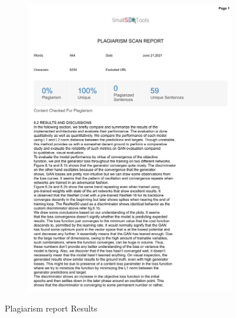 \documentclass[oneside,a4paper,12pt]{report}
\begin{document}
\begin{appendices}
\begin{figure}
	\begin{subfigure}[H]{\textwidth}
		\centering
    	\includegraphics[scale=0.7, page=1]{plagiarism/results_1.pdf}
    \end{subfigure}
 \caption{Plagiarism report Results}
    \label{PlagiarismResults}
\end{figure}
\begin{figure}\ContinuedFloat
    \begin{subfigure}[H]{\textwidth}
    	\centering

\end{subfigure}
\end{figure}
\end{appendices}
\end{document}
